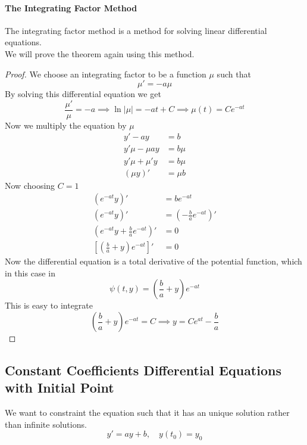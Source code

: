 \documentclass{article}
\begin{document}
\paragraph{The Integrating Factor Method}
The integrating factor method is a method for solving linear
differential equations.
\\
We will prove the theorem again using this method.
\begin{proof}
    We choose an integrating factor to be a function \(\mu\) such that
    \[
        \mu'=-a\mu
    \]
    By solving this differential equation we get
    \[
        \frac{\mu'}{\mu} = -a
        \implies
        \ln|\mu| = -at+C
        \implies
        \mu(t) = Ce^{-at}
    \]
    Now we multiply the equation by \(\mu\)
    \begin{align*}
        y'-ay&=b \\
        y'\mu - \mu ay &= b\mu \\
        y'\mu + \mu' y &= b \mu \\
        (\mu y)' &= \mu b
    \end{align*}
    Now choosing \(C=1\)
    \begin{align*}
        \left(e^{-at}y\right)'&=be^{-at} \\
        \left(e^{-at}y\right)'&=\left(-\frac{b}{a}e^{-at}\right)' \\
        \left(e^{-at}y+\frac{b}{a}e^{-at}\right)' &= 0 \\
        \left[\left(\frac{b}{a} + y\right)e^{-at}\right]' &= 0
    \end{align*}
    Now the differential equation is a total derivative of the potential function,
    which in this case in
    \[
        \psi(t, y) = \left(\frac{b}{a} + y\right)e^{-at}
    \]
    This is easy to integrate
    \[
        \left(\frac{b}{a} + y\right)e^{-at} = C
        \implies
        y = Ce^{at} - \frac{b}{a}
    \]
\end{proof}

\pagebreak

\subsection{Constant Coefficients Differential Equations with Initial Point}

We want to constraint the equation such that it has an unique solution
rather than infinite solutions.
\[
    y' = ay + b, \quad y(t_0) = y_0
\]
\end{document}
